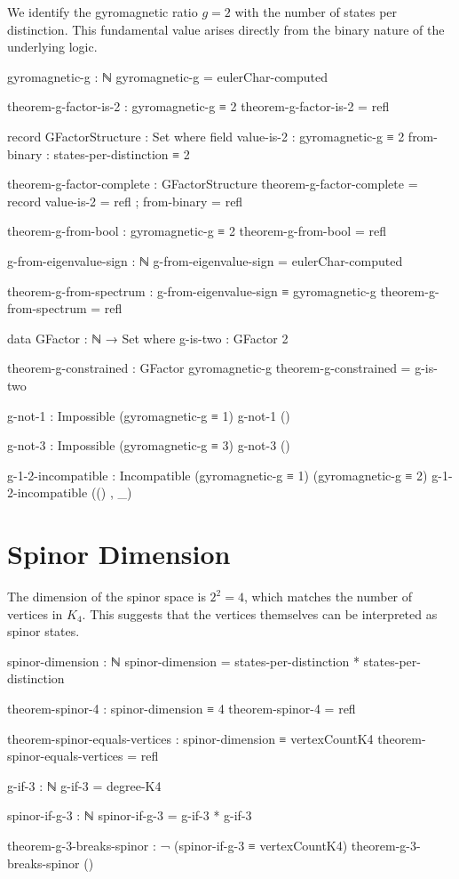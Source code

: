 \documentclass[11pt,a4paper]{book}
\begin{document}
We identify the gyromagnetic ratio $g=2$ with the number of states per distinction. This fundamental value arises directly from the binary nature of the underlying logic.

\begin{code}
gyromagnetic-g : ℕ
gyromagnetic-g = eulerChar-computed

theorem-g-factor-is-2 : gyromagnetic-g ≡ 2
theorem-g-factor-is-2 = refl

record GFactorStructure : Set where
  field
    value-is-2 : gyromagnetic-g ≡ 2
    from-binary : states-per-distinction ≡ 2

theorem-g-factor-complete : GFactorStructure
theorem-g-factor-complete = record
  { value-is-2 = refl
  ; from-binary = refl
  }

theorem-g-from-bool : gyromagnetic-g ≡ 2
theorem-g-from-bool = refl
\end{code}

\begin{code}
g-from-eigenvalue-sign : ℕ
g-from-eigenvalue-sign = eulerChar-computed

theorem-g-from-spectrum : g-from-eigenvalue-sign ≡ gyromagnetic-g
theorem-g-from-spectrum = refl

data GFactor : ℕ → Set where
  g-is-two : GFactor 2

theorem-g-constrained : GFactor gyromagnetic-g
theorem-g-constrained = g-is-two

g-not-1 : Impossible (gyromagnetic-g ≡ 1)
g-not-1 ()

g-not-3 : Impossible (gyromagnetic-g ≡ 3)
g-not-3 ()

g-1-2-incompatible : Incompatible (gyromagnetic-g ≡ 1) (gyromagnetic-g ≡ 2)
g-1-2-incompatible (() , _)
\end{code}

\section{Spinor Dimension}

The dimension of the spinor space is $2^2 = 4$, which matches the number of vertices in $K_4$. This suggests that the vertices themselves can be interpreted as spinor states.

\begin{code}
spinor-dimension : ℕ
spinor-dimension = states-per-distinction * states-per-distinction

theorem-spinor-4 : spinor-dimension ≡ 4
theorem-spinor-4 = refl

theorem-spinor-equals-vertices : spinor-dimension ≡ vertexCountK4
theorem-spinor-equals-vertices = refl

g-if-3 : ℕ
g-if-3 = degree-K4

spinor-if-g-3 : ℕ
spinor-if-g-3 = g-if-3 * g-if-3

theorem-g-3-breaks-spinor : ¬ (spinor-if-g-3 ≡ vertexCountK4)
theorem-g-3-breaks-spinor ()
\end{code}
\end{document}
